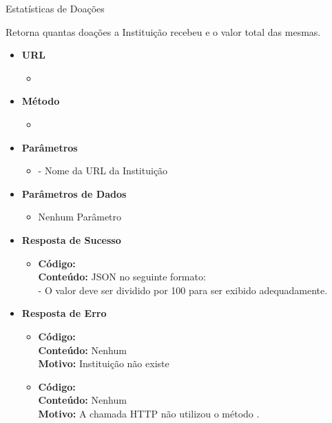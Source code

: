 
\begin{caixa}{Estatísticas de Doações}{}

Retorna quantas doações a Instituição recebeu e o valor total das mesmas.

\begin{itemize}
\item \textbf{URL}
	\begin{itemize}
		\item {}
	\end{itemize}

\item \textbf{Método}
	\begin{itemize}
		\item {}
	\end{itemize}

\item \textbf{Parâmetros}
	\begin{itemize}
		\item {} - Nome da URL da Instituição
	\end{itemize}

\item \textbf{Parâmetros de Dados}
	\begin{itemize}
		\item Nenhum Parâmetro
	\end{itemize}

\item \textbf{Resposta de Sucesso}
	\begin{itemize}
		\item \textbf{Código:}  \\ \textbf{Conteúdo:} JSON no seguinte formato: \\  - O valor deve ser dividido por 100 para ser exibido adequadamente.
	\end{itemize}

\item \textbf{Resposta de Erro}
	\begin{itemize}
		\item \textbf{Código:}  \\ \textbf{Conteúdo:} Nenhum \\ \textbf{Motivo:} Instituição não existe
        \item \textbf{Código:}  \\ \textbf{Conteúdo:} Nenhum \\ \textbf{Motivo:} A chamada HTTP não utilizou o método .
	\end{itemize}

\end{itemize}
\end{caixa}

